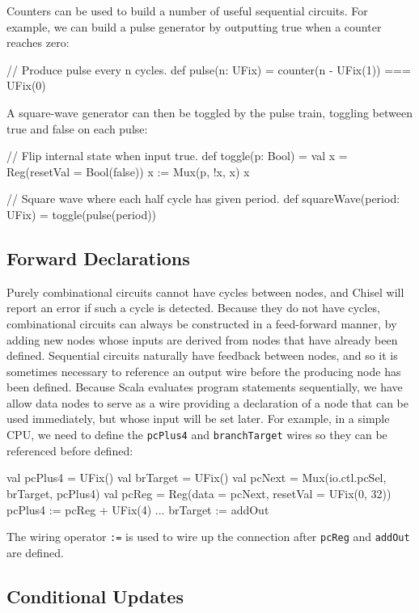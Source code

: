 \documentclass[twocolumn,10pt]{article}
\begin{document}
Counters can be used to build a number of useful sequential circuits.
For example, we can build a pulse generator by outputting true when
a counter reaches zero:
\begin{scala}
// Produce pulse every n cycles.
def pulse(n: UFix) = counter(n - UFix(1)) === UFix(0)
\end{scala}

\noindent
A square-wave generator can then be toggled by the pulse train,
toggling between true and false on each pulse:
\begin{scala}
// Flip internal state when input true.
def toggle(p: Bool) = {
  val x = Reg(resetVal = Bool(false))
  x := Mux(p, !x, x)
  x
}

// Square wave where each half cycle has given period.
def squareWave(period: UFix) = toggle(pulse(period))
\end{scala}

\subsection{Forward Declarations}

Purely combinational circuits cannot have cycles between nodes, and
Chisel will report an error if such a cycle is detected.  Because they
do not have cycles, combinational circuits can always be constructed
in a feed-forward manner, by adding new nodes whose inputs are derived
from nodes that have already been defined.  Sequential circuits
naturally have feedback between nodes, and so it is sometimes
necessary to reference an output wire before the producing node has
been defined.  Because Scala evaluates program statements
sequentially, we have allow data nodes to serve as a wire providing
a declaration of a node that can be used immediately, but whose
input will be set later.  
For example, in a simple CPU, we need to define the \verb!pcPlus4!
and \verb!branchTarget! wires so they can be referenced before defined:
\begin{scala}
val pcPlus4  = UFix()
val brTarget = UFix()
val pcNext   = Mux(io.ctl.pcSel, brTarget, pcPlus4)
val pcReg    = Reg(data = pcNext, resetVal = UFix(0, 32))
pcPlus4     := pcReg + UFix(4)
...
brTarget    := addOut
\end{scala}

\noindent
The wiring operator
\verb!:=! is used to wire up
the connection after \verb!pcReg! and \verb!addOut! are defined.

\subsection{Conditional Updates}
\end{document}
